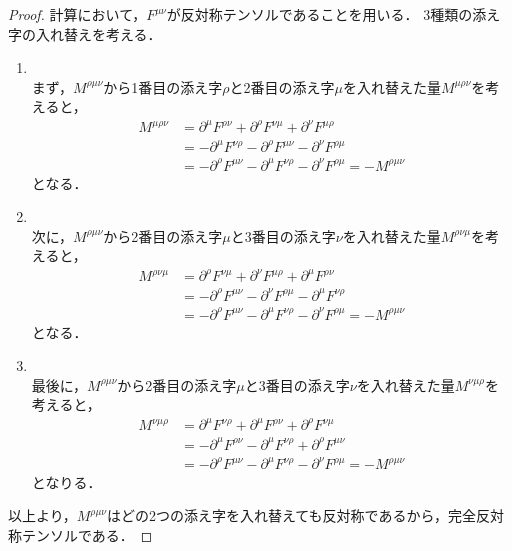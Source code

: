 \documentclass{report}
\begin{document}
    \begin{proof}
      計算において，$F^{\mu\nu}$が反対称テンソルであることを用いる．
      3種類の添え字の入れ替えを考える．
      \begin{enumerate}
        \item~\\ 
          まず，$M^{\rho\mu\nu}$から1番目の添え字$\rho$と2番目の添え字$\mu$を入れ替えた量$M^{\mu\rho\nu}$を考えると，
          \begin{align}
            M^{\mu\rho\nu} &= \partial^{\mu}F^{\rho\nu} + \partial^{\rho}F^{\nu\mu} + \partial^{\nu}F^{\mu\rho} \\ 
            &= -\partial^{\mu}F^{\nu\rho} - \partial^{\rho}F^{\mu\nu} - \partial^{\nu}F^{\rho\mu} \\ 
            &= -\partial^{\rho}F^{\mu\nu} - \partial^{\mu}F^{\nu\rho} - \partial^{\nu}F^{\rho\mu} = -M^{\rho\mu\nu}
          \end{align}
          となる．
        \item~\\
          次に，$M^{\rho\mu\nu}$から2番目の添え字$\mu$と3番目の添え字$\nu$を入れ替えた量$M^{\rho\nu\mu}$を考えると，
          \begin{align}
            M^{\rho\nu\mu} &= \partial^{\rho}F^{\nu\mu} + \partial^{\nu}F^{\mu\rho} + \partial^{\mu}F^{\rho\nu} \\ 
            &= -\partial^{\rho}F^{\mu\nu} - \partial^{\nu}F^{\rho\mu} - \partial^{\mu}F^{\nu\rho} \\ 
            &= -\partial^{\rho}F^{\mu\nu} - \partial^{\mu}F^{\nu\rho} - \partial^{\nu}F^{\rho\mu} = -M^{\rho\mu\nu}
          \end{align}
          となる．
        \item~\\
          最後に，$M^{\rho\mu\nu}$から2番目の添え字$\mu$と3番目の添え字$\nu$を入れ替えた量$M^{\nu\mu\rho}$を考えると，
          \begin{align}
            M^{\nu\mu\rho} &= \partial^{\mu}F^{\nu\rho} + \partial^{\mu}F^{\rho\nu} + \partial^{\rho}F^{\nu\mu} \\ 
            &= -\partial^{\mu}F^{\rho\nu} - \partial^{\mu}F^{\nu\rho} + \partial^{\rho}F^{\mu\nu} \\ 
            &= -\partial^{\rho}F^{\mu\nu} - \partial^{\mu}F^{\nu\rho} - \partial^{\nu}F^{\rho\mu} = -M^{\rho\mu\nu}
          \end{align}
          となりる．
      \end{enumerate}
      以上より，$M^{\rho\mu\nu}$はどの2つの添え字を入れ替えても反対称であるから，完全反対称テンソルである．
    \end{proof}
\end{document}
